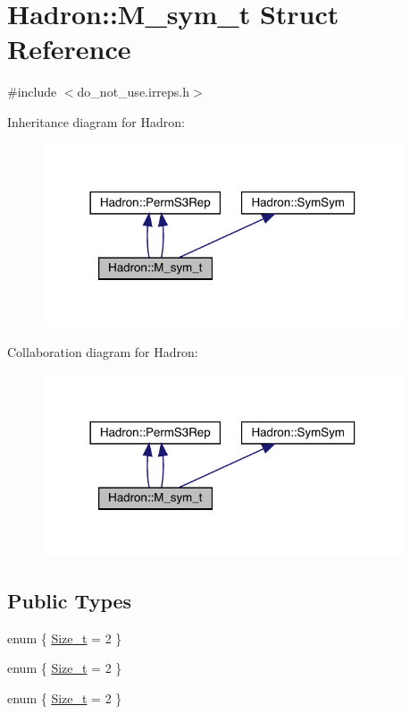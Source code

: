 \hypertarget{structHadron_1_1M__sym__t}{}\section{Hadron\+:\+:M\+\_\+sym\+\_\+t Struct Reference}
\label{structHadron_1_1M__sym__t}


{\ttfamily \#include $<$do\+\_\+not\+\_\+use.\+irreps.\+h$>$}



Inheritance diagram for Hadron\+:\nopagebreak
\begin{figure}[H]
\begin{center}
\leavevmode
\includegraphics[width=302pt]{d8/d8f/structHadron_1_1M__sym__t__inherit__graph}
\end{center}
\end{figure}


Collaboration diagram for Hadron\+:\nopagebreak
\begin{figure}[H]
\begin{center}
\leavevmode
\includegraphics[width=302pt]{d2/d71/structHadron_1_1M__sym__t__coll__graph}
\end{center}
\end{figure}
\subsection*{Public Types}
\begin{DoxyCompactItemize}
\item 
enum \{ \mbox{\hyperlink{structHadron_1_1M__sym__t_a1137b3433247b356fea83722e6c1d354a89b69a9b3569a16794a38da9585da200}{Size\+\_\+t}} = 2
 \}
\item 
enum \{ \mbox{\hyperlink{structHadron_1_1M__sym__t_a1137b3433247b356fea83722e6c1d354a89b69a9b3569a16794a38da9585da200}{Size\+\_\+t}} = 2
 \}
\item 
enum \{ \mbox{\hyperlink{structHadron_1_1M__sym__t_a1137b3433247b356fea83722e6c1d354a89b69a9b3569a16794a38da9585da200}{Size\+\_\+t}} = 2
 \}
\end{DoxyCompactItemize}
